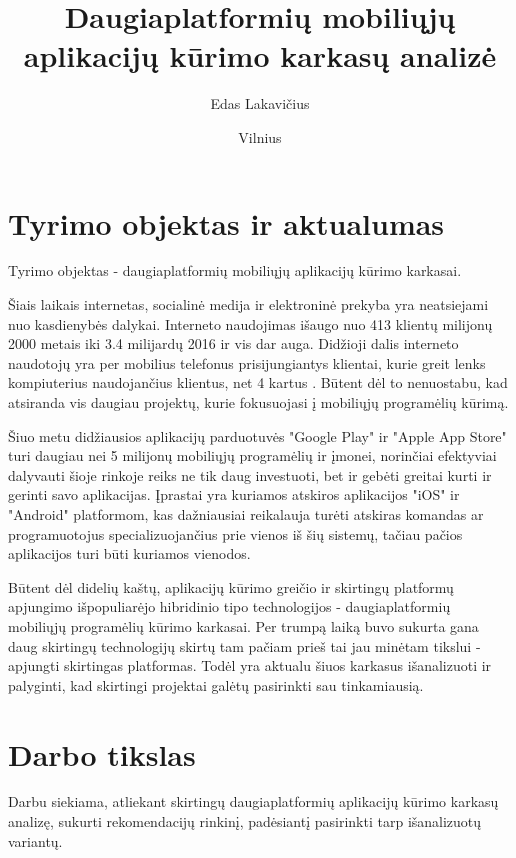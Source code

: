 \documentclass{VUMIFInfBakalaurinis}
\title{Daugiaplatformių mobiliųjų aplikacijų kūrimo karkasų analizė}
\author{Edas Lakavičius}
\date{Vilnius \\ \the\year}
\begin{document}
\maketitle

\tableofcontents

\section{Tyrimo objektas ir aktualumas}
Tyrimo objektas - daugiaplatformių mobiliųjų aplikacijų kūrimo karkasai.

Šiais laikais internetas, socialinė medija ir elektroninė prekyba yra neatsiejami nuo kasdienybės dalykai. Interneto naudojimas išaugo nuo 413 klientų milijonų 2000 metais iki 3.4 milijardų 2016 \cite{owidinternet} ir vis dar auga. Didžioji dalis interneto naudotojų yra per mobilius telefonus prisijungiantys klientai, kurie greit lenks kompiuterius naudojančius klientus, net 4 kartus \cite{internetusage}. Būtent dėl to nenuostabu, kad atsiranda vis daugiau projektų, kurie fokusuojasi į mobiliųjų programėlių kūrimą.

Šiuo metu didžiausios aplikacijų parduotuvės "Google Play" ir "Apple App Store" turi daugiau nei 5 milijonų mobiliųjų programėlių \cite{appcount} ir įmonei, norinčiai efektyviai dalyvauti šioje rinkoje reiks ne tik daug investuoti, bet ir gebėti greitai kurti ir gerinti savo aplikacijas. Įprastai yra kuriamos atskiros aplikacijos "iOS" ir "Android" platformom, kas dažniausiai reikalauja turėti atskiras komandas ar programuotojus specializuojančius prie vienos iš šių sistemų, tačiau pačios aplikacijos turi būti kuriamos vienodos.

Būtent dėl didelių kaštų, aplikacijų kūrimo greičio ir skirtingų platformų apjungimo išpopuliarėjo hibridinio tipo technologijos - daugiaplatformių mobiliųjų programėlių kūrimo karkasai. Per trumpą laiką buvo sukurta gana daug skirtingų technologijų skirtų tam pačiam prieš tai jau minėtam tikslui - apjungti skirtingas platformas. Todėl yra aktualu šiuos karkasus išanalizuoti ir palyginti, kad skirtingi projektai galėtų pasirinkti sau tinkamiausią.


\section{Darbo tikslas}
Darbu siekiama, atliekant skirtingų daugiaplatformių aplikacijų kūrimo karkasų analizę, sukurti rekomendacijų rinkinį, padėsiantį pasirinkti tarp išanalizuotų variantų.
\end{document}
